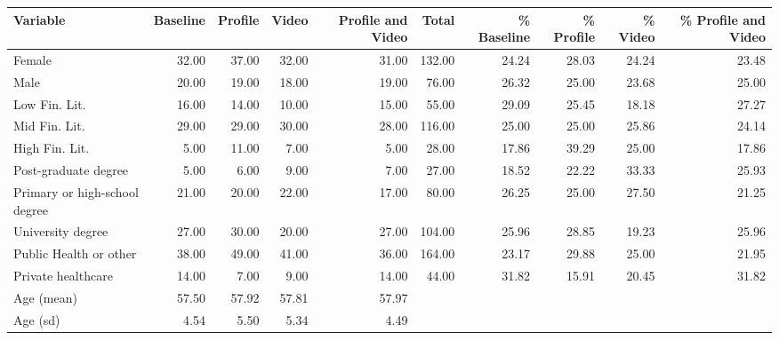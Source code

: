 \begin{tabular}{lrrrrrrrrr}
  \hline
Variable & Baseline & Profile & Video & Profile and Video & Total & \% Baseline & \% Profile & \% Video & \% Profile and Video \\ 
  \hline
Female & 32.00 & 37.00 & 32.00 & 31.00 & 132.00 & 24.24 & 28.03 & 24.24 & 23.48 \\ 
  Male & 20.00 & 19.00 & 18.00 & 19.00 & 76.00 & 26.32 & 25.00 & 23.68 & 25.00 \\ 
  Low Fin. Lit. & 16.00 & 14.00 & 10.00 & 15.00 & 55.00 & 29.09 & 25.45 & 18.18 & 27.27 \\ 
  Mid Fin. Lit. & 29.00 & 29.00 & 30.00 & 28.00 & 116.00 & 25.00 & 25.00 & 25.86 & 24.14 \\ 
  High Fin. Lit. & 5.00 & 11.00 & 7.00 & 5.00 & 28.00 & 17.86 & 39.29 & 25.00 & 17.86 \\ 
  Post-graduate degree & 5.00 & 6.00 & 9.00 & 7.00 & 27.00 & 18.52 & 22.22 & 33.33 & 25.93 \\ 
  Primary or high-school degree & 21.00 & 20.00 & 22.00 & 17.00 & 80.00 & 26.25 & 25.00 & 27.50 & 21.25 \\ 
  University degree & 27.00 & 30.00 & 20.00 & 27.00 & 104.00 & 25.96 & 28.85 & 19.23 & 25.96 \\ 
  Public Health or other & 38.00 & 49.00 & 41.00 & 36.00 & 164.00 & 23.17 & 29.88 & 25.00 & 21.95 \\ 
  Private healthcare & 14.00 & 7.00 & 9.00 & 14.00 & 44.00 & 31.82 & 15.91 & 20.45 & 31.82 \\ 
  Age (mean) & 57.50 & 57.92 & 57.81 & 57.97 &  &  &  &  &  \\ 
  Age (sd) & 4.54 & 5.50 & 5.34 & 4.49 &  &  &  &  &  \\ 
   \hline
\end{tabular}
